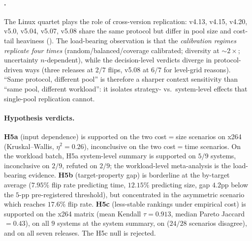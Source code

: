 \paragraph*{\StudyLinux.}
The Linux quartet plays the role of cross-version replication:
v4.13, v4.15, v4.20, v5.0, v5.04, v5.07, v5.08 share the same protocol but differ in
pool size and cost-tail heaviness (). The
load-bearing observation is that the \emph{calibration regimes
replicate four times} (random/balanced/coverage calibrated;
diversity at $\sim\!\!2\times$; uncertainty $n$-dependent), while
the decision-level verdicts diverge in protocol-driven ways (three
releases at $2/7$ flips, v5.08 at $6/7$ for level-grid reasons).
``Same protocol, different pool'' is therefore a sharper context
sensitivity than ``same pool, different workload'': it isolates
strategy- vs.\ system-level effects that single-pool replication
cannot.


\paragraph*{Hypothesis verdicts.}
\textbf{H5a} (input dependence) is supported on the two cost$=$size
scenarios on x264 (Kruskal--Wallis, $\eta^{2}\!=\!0.26$),
inconclusive on the two cost$=$time scenarios. On the workload
batch, H5a system-level summary is supported on $5/9$ systems,
inconclusive on $2/9$, refuted on $2/9$; the workload-level
meta-analysis is the load-bearing evidence.
\textbf{H5b} (target-property gap) is borderline at the by-target
average ($7.95\%$ flip rate predicting time, $12.15\%$ predicting
size, gap $4.2$pp below the $5$-pp pre-registered threshold), but
concentrated in the asymmetric scenario which reaches $17.6\%$
flip rate.
\textbf{H5c} (less-stable rankings under empirical cost) is
supported on the x264 matrix (mean Kendall $\tau\!=\!0.913$, median
Pareto Jaccard $\!=\!0.43$), on all $9$ \dsWLI systems at
the system summary, on \StudyEnergy ($24/28$ scenarios disagree), and on
all seven \StudyLinux releases. The H5c null is rejected.

